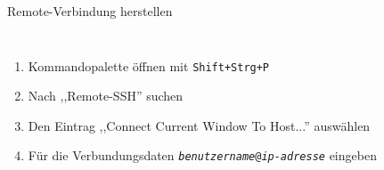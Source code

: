 {%
{
\scriptsize
\setlength{\fboxsep}{0pt}

\begin{frame}{Remote-Verbindung herstellen}
    \begin{columns}




        \begin{enumerate}
            \item Kommandopalette öffnen mit \texttt{Shift+Strg+P}
            \item Nach ,,Remote-SSH'' suchen
            \item Den Eintrag ,,Connect Current Window To Host...'' auswählen
            \item Für die Verbundungsdaten \texttt{\textit{benutzername}@\textit{ip-adresse}} eingeben
        \end{enumerate}
    \end{columns}


\end{frame}}}
